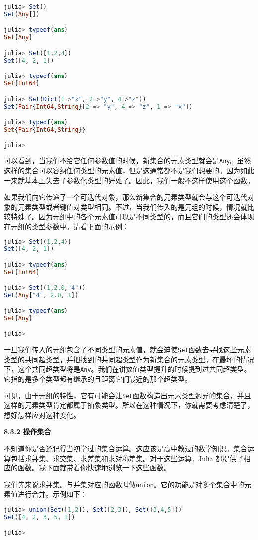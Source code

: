 \begin{lstlisting}[language=julia]
julia> Set()
Set(Any[])

julia> typeof(ans)
Set{Any}

julia> Set([1,2,4])
Set([4, 2, 1])

julia> typeof(ans)
Set{Int64}

julia> Set(Dict(1=>"x", 2=>"y", 4=>"z"))
Set(Pair{Int64,String}[2 => "y", 4 => "z", 1 => "x"])

julia> typeof(ans)
Set{Pair{Int64,String}}

julia> 
\end{lstlisting}

可以看到，当我们不给它任何参数值的时候，新集合的元素类型就会是\verb`Any`。虽然这样的集合可以容纳任何类型的元素值，但是这通常都不是我们想要的。因为如此一来就基本上失去了参数化类型的好处了。因此，我们一般不这样使用这个函数。

如果我们向它传递了一个可迭代对象，那么新集合的元素类型就会与这个可迭代对象的元素类型或者键值对类型相同。不过，当我们传入的是元组的时候，情况就比较特殊了。因为元组中的各个元素值可以是不同类型的，而且它们的类型还会体现在元组的类型参数中。请看下面的示例：

\begin{lstlisting}[language=julia]
julia> Set((1,2,4))
Set([4, 2, 1])

julia> typeof(ans)
Set{Int64}

julia> Set((1,2.0,"4"))
Set(Any["4", 2.0, 1])

julia> typeof(ans)
Set{Any}

julia> 
\end{lstlisting}

一旦我们传入的元组包含了不同类型的元素值，就会迫使\verb`Set`函数去寻找这些元素类型的共同超类型，并把找到的共同超类型作为新集合的元素类型。在最坏的情况下，这个共同超类型将是\verb`Any`。我们在讲数值类型提升的时候提到过共同超类型。它指的是多个类型都有继承的且距离它们最近的那个超类型。

可见，由于元组的特性，它有可能会让\verb`Set`函数构造出元素类型迥异的集合，并且这样的元素类型肯定都属于抽象类型。所以在这种情况下，你就需要考虑清楚了，想好怎样应对这种变化。

\textbf{8.3.2 操作集合}

不知道你是否还记得当初学过的集合运算。这应该是高中教过的数学知识。集合运算包括求并集、求交集、求差集和求对称差集。对于这些运算，Julia 都提供了相应的函数。我下面就带着你快速地浏览一下这些函数。

我们先来说求并集。与并集对应的函数叫做\verb`union`。它的功能是对多个集合中的元素值进行合并。示例如下：
\begin{lstlisting}[language=julia]
julia> union(Set([1,2]), Set([2,3]), Set([3,4,5]))
Set([4, 2, 3, 5, 1])

julia> 
\end{lstlisting}

